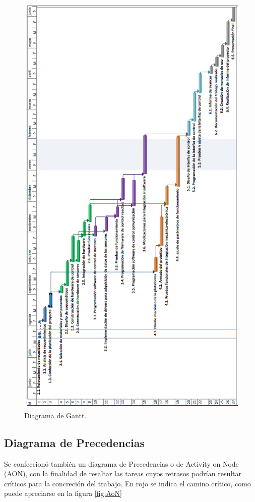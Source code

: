 \begin{figure}[htpb]
\centering 
\includegraphics[width=\textwidth]{./Figures/Gantt.PNG}
\caption{Diagrama de Gantt.}
\label{fig:gantt2}
\end{figure}

\pagebreak

\subsection{Diagrama de Precedencias}
Se confeccionó también un diagrama de Precedencias o de Activity on Node (AON), con la finalidad de resaltar las tareas cuyos retrasos podrían resultar críticos para la concreción del trabajo. En rojo se indica el camino crítico, como puede apreciarse en la figura \ref{fig:AoN}

